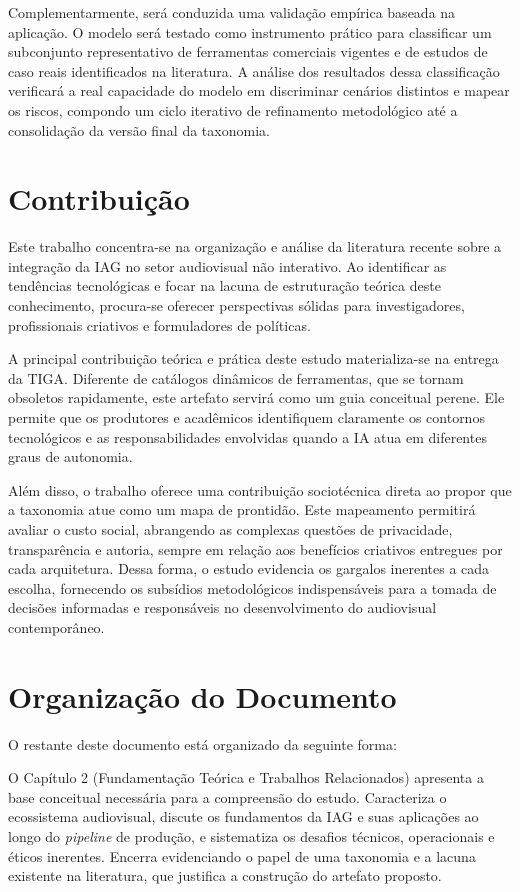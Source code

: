 Complementarmente, será conduzida uma validação empírica baseada na aplicação. O modelo será testado como instrumento prático para classificar um subconjunto representativo de ferramentas comerciais vigentes e de estudos de caso reais identificados na literatura. A análise dos resultados dessa classificação verificará a real capacidade do modelo em discriminar cenários distintos e mapear os riscos, compondo um ciclo iterativo de refinamento metodológico até a consolidação da versão final da taxonomia.

\section{Contribuição}
\label{sec:intro:contribuicao}
Este trabalho concentra-se na organização e análise da literatura recente sobre a integração da IAG no setor audiovisual não interativo. Ao identificar as tendências tecnológicas e focar na lacuna de estruturação teórica deste conhecimento, procura-se oferecer perspectivas sólidas para investigadores, profissionais criativos e formuladores de políticas.

A principal contribuição teórica e prática deste estudo materializa-se na entrega da TIGA. Diferente de catálogos dinâmicos de ferramentas, que se tornam obsoletos rapidamente, este artefato servirá como um guia conceitual perene. Ele permite que os produtores e acadêmicos identifiquem claramente os contornos tecnológicos e as responsabilidades envolvidas quando a IA atua em diferentes graus de autonomia.

Além disso, o trabalho oferece uma contribuição sociotécnica direta ao propor que a taxonomia atue como um mapa de prontidão. Este mapeamento permitirá avaliar o custo social, abrangendo as complexas questões de privacidade, transparência e autoria, sempre em relação aos benefícios criativos entregues por cada arquitetura. Dessa forma, o estudo evidencia os gargalos inerentes a cada escolha, fornecendo os subsídios metodológicos indispensáveis para a tomada de decisões informadas e responsáveis no desenvolvimento do audiovisual contemporâneo.

\section{Organização do Documento}
\label{sec:intro:organizacao}

O restante deste documento está organizado da seguinte forma:

O Capítulo 2 (Fundamentação Teórica e Trabalhos Relacionados) apresenta a base conceitual necessária para a compreensão do estudo. Caracteriza o ecossistema audiovisual, discute os fundamentos da IAG e suas aplicações ao longo do \textit{pipeline} de produção, e sistematiza os desafios técnicos, operacionais e éticos inerentes. Encerra evidenciando o papel de uma taxonomia e a lacuna existente na literatura, que justifica a construção do artefato proposto.

